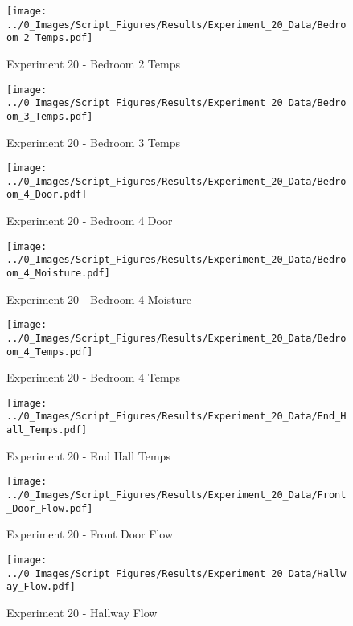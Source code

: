 	\begin{figure}[H]
		\centering
		\texttt{[image: ../0\_Images/Script\_Figures/Results/Experiment\_20\_Data/Bedroom\_2\_Temps.pdf]}
		\caption[]{Experiment 20 - Bedroom 2 Temps}
	\end{figure}
 
	\clearpage

	\begin{figure}[H]
		\centering
		\texttt{[image: ../0\_Images/Script\_Figures/Results/Experiment\_20\_Data/Bedroom\_3\_Temps.pdf]}
		\caption[]{Experiment 20 - Bedroom 3 Temps}
	\end{figure}
 

	\begin{figure}[H]
		\centering
		\texttt{[image: ../0\_Images/Script\_Figures/Results/Experiment\_20\_Data/Bedroom\_4\_Door.pdf]}
		\caption[]{Experiment 20 - Bedroom 4 Door}
	\end{figure}
 
	\clearpage

	\begin{figure}[H]
		\centering
		\texttt{[image: ../0\_Images/Script\_Figures/Results/Experiment\_20\_Data/Bedroom\_4\_Moisture.pdf]}
		\caption[]{Experiment 20 - Bedroom 4 Moisture}
	\end{figure}
 

	\begin{figure}[H]
		\centering
		\texttt{[image: ../0\_Images/Script\_Figures/Results/Experiment\_20\_Data/Bedroom\_4\_Temps.pdf]}
		\caption[]{Experiment 20 - Bedroom 4 Temps}
	\end{figure}
 
	\clearpage

	\begin{figure}[H]
		\centering
		\texttt{[image: ../0\_Images/Script\_Figures/Results/Experiment\_20\_Data/End\_Hall\_Temps.pdf]}
		\caption[]{Experiment 20 - End Hall Temps}
	\end{figure}
 

	\begin{figure}[H]
		\centering
		\texttt{[image: ../0\_Images/Script\_Figures/Results/Experiment\_20\_Data/Front\_Door\_Flow.pdf]}
		\caption[]{Experiment 20 - Front Door Flow}
	\end{figure}
 
	\clearpage

	\begin{figure}[H]
		\centering
		\texttt{[image: ../0\_Images/Script\_Figures/Results/Experiment\_20\_Data/Hallway\_Flow.pdf]}
		\caption[]{Experiment 20 - Hallway Flow}
	\end{figure}
 

